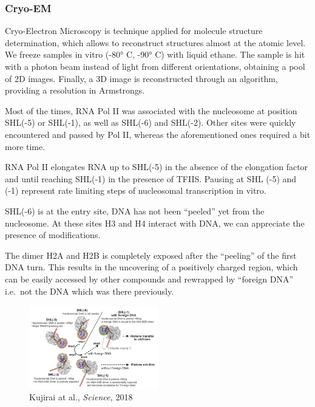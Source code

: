 \hypertarget{cryo-em}{%
\subsubsection{Cryo-EM}\label{cryo-em}}

Cryo-Electron Microscopy is technique applied for molecule structure determination, which allows to reconstruct structures almost at the atomic level. We freeze samples in vitro (-80° C, -90° C) with liquid ethane. The sample is hit with a photon beam instead of light from different orientations, obtaining a pool of 2D images. Finally, a 3D image is reconstructed through an algorithm, providing a resolution in Armstrongs.


Most of the times, RNA Pol II was associated with the nucleosome at position SHL(-5) or SHL(-1), as well as SHL(-6) and SHL(-2). Other sites were quickly encountered and passed by Pol II, whereas the aforementioned ones required a bit more time. 

RNA Pol II elongates RNA up to SHL(-5) in the absence of the elongation factor and until reaching SHL(-1) in the presence of TFIIS. Pausing at SHL (-5) and (-1) represent rate limiting steps of nucleosomal transcription in vitro.


SHL(-6) is at the entry site, DNA has not been ``peeled'' yet from the nucleosome. At these sites H3 and H4 interact with DNA, we can appreciate the presence of modifications.

The dimer H2A and H2B is completely exposed after the ``peeling'' of the first DNA turn. This results in the uncovering of a positively charged region, which can be easily accessed by other compounds and rewrapped by ``foreign DNA'' i.e.~not the DNA which was there previously.

\begin{figure}
\centering
\includegraphics[width=0.5\textwidth]{../_resources/Screenshot_2022-10-05_at_23-02-04.png}
\caption{Kujirai at al., \emph{Science,} 2018}
\end{figure}

